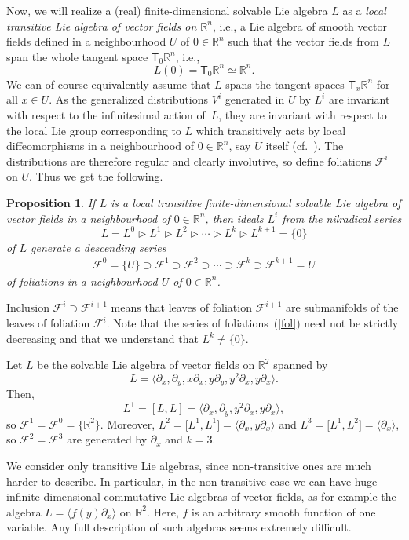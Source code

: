 \documentclass[11pt]{article}
\numberwithin{equation}{section}
\numberwithin{equation}{section}
\newtheorem{Proposition}[Theorem]{Proposition}
 { \theoremstyle{definition}
\newtheorem{Definition}[Theorem]{Definition}
\newtheorem{Example}[Theorem]{Example}
\newtheorem{Remark}[Theorem]{Remark} }
\begin{document}
Now, we will realize a (real) finite-dimensional solvable Lie algebra $L$ as a \emph{local transitive Lie algebra of vector fields on ${\mathbb R}^n$}, i.e., a Lie algebra of smooth vector fields defined in a neighbourhood $U$ of $0\in{\mathbb R}^n$ such that the vector fields from $L$ span the whole tangent space ${\mathsf T}_0{\mathbb R}^n$, i.e.,
\[ L(0)={\mathsf T}_0{\mathbb R}^n\simeq{\mathbb R}^n .\]
We can of course equivalently assume that $L$ spans the tangent spaces ${\mathsf T}_x{\mathbb R}^n$ for all $x\in U$.
As the generalized distributions $V^i$ generated in $U$ by $L^i$ are invariant with respect to the infinitesimal action of~$L$, they are invariant with respect to the local Lie group corresponding to $L$ which transitively acts by local diffeomorphisms in a neighbourhood of $0\in{\mathbb R}^n$, say $U$ itself (cf.~\cite{Palais}). The distributions are therefore regular and clearly involutive, so define foliations ${\mathcal F}^i$ on $U$. Thus we get the following.

\begin{Proposition}
If $L$ is a local transitive finite-dimensional solvable Lie algebra of vector fields in a neighbourhood of $0\in{\mathbb R}^n$, then ideals $L^i$ from the nilradical series
\[ L=L^0\vartriangleright L^1\vartriangleright L^2\vartriangleright\cdots\vartriangleright L^k\vartriangleright L^{k+1}=\{ 0\}\]
of $L$ generate a descending series
\begin{gather}\label{fol}{\mathcal F}^0=\{ U\}\supset{\mathcal F}^1\supset{\mathcal F}^2\supset \cdots\supset {\mathcal F}^{k}\supset {\mathcal F}^{k+1}=U \end{gather}
of foliations in a neighbourhood $U$ of $0\in{\mathbb R}^n$.
\end{Proposition}

Inclusion ${\mathcal F}^i\supset{\mathcal F}^{i+1}$ means that leaves of foliation ${\mathcal F}^{i+1}$ are submanifolds of the leaves of foliation ${\mathcal F}^{i}$. Note that the series of foliations~(\ref{fol}) need not be strictly decreasing and that we understand that $L^k\ne\{ 0\}$.
\begin{Example}\label{ex2}
Let $L$ be the solvable Lie algebra of vector fields on ${\mathbb R}^2$ spanned by
\[ L=\big\langle \partial_x ,\partial_y ,x\partial_x ,y\partial_y ,y^2\partial_x ,y\partial_x\big\rangle .\]
Then,
\[ L^1=[L,L]=\big\langle \partial_x ,\partial_y ,y^2\partial_x ,y\partial_x\big\rangle ,\]
so ${\mathcal F}^1={\mathcal F}^0=\big\{{\mathbb R}^2\big\}$. Moreover, $L^2=\big[L^1,L^1\big]=\langle\partial_x ,y\partial_x\rangle$ and $L^3=\big[L^1,L^2\big]=\langle\partial_x\rangle$, so ${\mathcal F}^2={\mathcal F}^3$ are generated by $\partial_x$ and $k=3$.
\end{Example}
\begin{Remark}We consider only transitive Lie algebras, since non-transitive ones are much harder to describe. In particular, in the non-transitive case we can have huge infinite-dimensional commutative Lie algebras of vector fields, as for example
the algebra $L=\langle f(y)\partial_x\rangle$ on ${\mathbb R}^2$. Here, $f$ is an arbitrary smooth function of one variable.
Any full description of such algebras seems extremely difficult.
\end{Remark}
\end{document}
